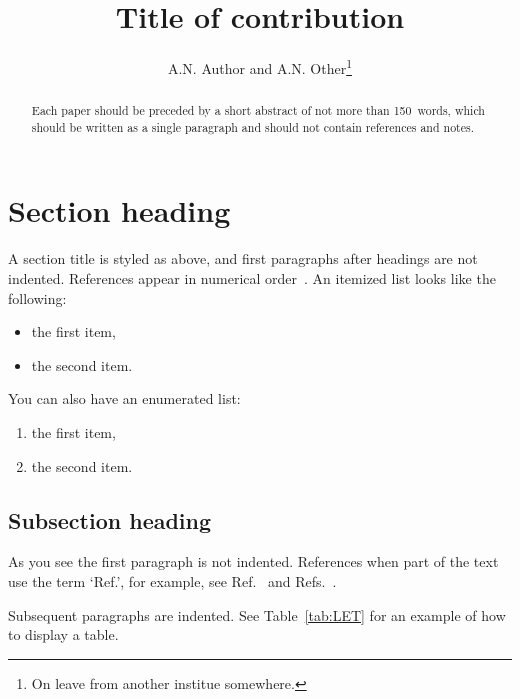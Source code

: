 \title{Title of contribution}
\author{A.N. Author and A.N. Other\thanks
                 {On leave from another institue somewhere.}}


\begin{abstract}
Each paper should be preceded by a short abstract of not more 
than 150~words, which should be written as a single paragraph 
and should not contain references and notes.
\end{abstract}


\maketitle

\section{Section heading}

A section title is styled as above, and first paragraphs after
headings are not indented. References appear in numerical
order~\cite{Raby1966,Dupont1961}. An itemized list looks like the following:
\begin{itemize}
\item the first item,
\item the second item.
\end{itemize}

You can also have an enumerated list:

\begin{enumerate}
\item the first item,
\item the second item.
\end{enumerate}

\subsection{Subsection heading}

As you see the first paragraph is not indented. References when part
      of the text use the term `Ref.', for example, see
      Ref.~\cite{Raby1966} and
      Refs.~\cite{Appleman1959,vanBerg1965,Bryant1985,Allen1977}.

Subsequent paragraphs are indented. See Table~\ref{tab:LET} for an
example of how to display a table.

